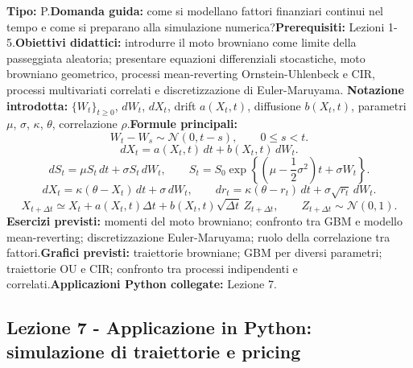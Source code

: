 \documentclass[12pt,a4paper]{article}%
\newcommand{\1}{\mathbf{1}}
\begin{document}
\textbf{Tipo:} P.\newline\textbf{Domanda guida:} come si modellano fattori
finanziari continui nel tempo e come si preparano alla simulazione
numerica?\newline\textbf{Prerequisiti:} Lezioni 1-5.\newline\textbf{Obiettivi
didattici:} introdurre il moto browniano come limite della passeggiata
aleatoria; presentare equazioni differenziali stocastiche, moto browniano
geometrico, processi mean-reverting Ornstein-Uhlenbeck e CIR, processi
multivariati correlati e discretizzazione di Euler-Maruyama.\newline%
\textbf{Notazione introdotta:} $\{W_{t}\}_{t\geq0}$, $dW_{t}$, $dX_{t}$, drift
$a(X_{t},t)$, diffusione $b(X_{t},t)$, parametri $\mu$, $\sigma$, $\kappa$,
$\theta$, correlazione $\rho$.\newline\textbf{Formule principali:}
\[
W_{t}-W_{s}\sim\mathcal{N}(0,t-s), \qquad0\leq s<t.
\]
\[
dX_{t}=a(X_{t},t)\,dt+b(X_{t},t)\,dW_{t}.
\]
\[
dS_{t}=\mu S_{t}\,dt+\sigma S_{t}\,dW_{t}, \qquad S_{t}=S_{0}\exp\left\{
\left( \mu-\frac{1}{2}\sigma^{2}\right) t+\sigma W_{t}\right\} .
\]
\[
dX_{t}=\kappa(\theta-X_{t})\,dt+\sigma\,dW_{t}, \qquad dr_{t}=\kappa
(\theta-r_{t})\,dt+\sigma\sqrt{r_{t}}\,dW_{t}.
\]
\[
X_{t+\Delta t}\simeq X_{t}+a(X_{t},t)\Delta t+b(X_{t},t)\sqrt{\Delta t}%
\,Z_{t+\Delta t}, \qquad Z_{t+\Delta t}\sim\mathcal{N}(0,1).
\]
\textbf{Esercizi previsti:} momenti del moto browniano; confronto tra GBM e
modello mean-reverting; discretizzazione Euler-Maruyama; ruolo della
correlazione tra fattori.\newline\textbf{Grafici previsti:} traiettorie
browniane; GBM per diversi parametri; traiettorie OU e CIR; confronto tra
processi indipendenti e correlati.\newline\textbf{Applicazioni Python
collegate:} Lezione 7.

\subsection{Lezione 7 - Applicazione in Python: simulazione di traiettorie e
pricing}
\end{document}
